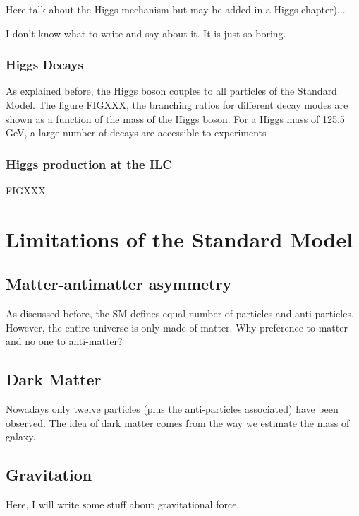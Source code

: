     Here talk about the Higgs mechanism but may be added in a Higgs chapter)...

    I don't know what to write and say about it. It is just so boring.


   \subsubsection{Higgs Decays}

   As explained before, the Higgs boson couples to all particles of the Standard Model.
   The figure FIGXXX, the branching ratios for different decay modes are shown as a function of the mass of the Higgs boson.
   For a Higgs mass of 125.5 GeV, a large number of decays are accessible to experiments

   \subsubsection{Higgs production at the ILC}

     FIGXXX
      
  \section{Limitations of the Standard Model}

    \subsection{Matter-antimatter asymmetry}

    As discussed before, the SM defines equal number of particles and anti-particles. 
    However, the entire universe is only made of matter. 
    Why preference to matter and no one to anti-matter? 

    \subsection{Dark Matter}
    
    Nowadays only twelve particles (plus the anti-particles associated) have been observed. 
    The idea of dark matter comes from the way we estimate the mass of galaxy.

    \subsection{Gravitation}         

    Here, I will write some stuff about gravitational force.



